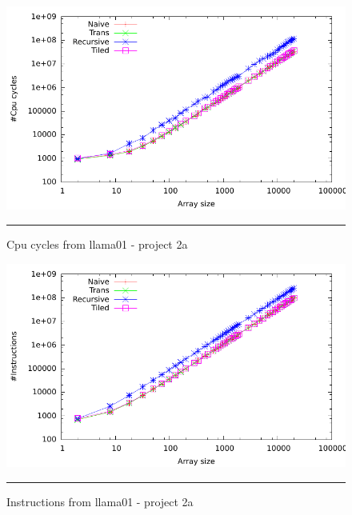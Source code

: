 \begin{figure}[ht]
	\centering
		\includegraphics[width=\textwidth]{./Appendices/Figures/Project2a/Cpu_cycles_putty.pdf}
		\rule{35em}{0.5pt}
	\caption*{
	Cpu cycles from llama01 - project 2a
	}
	\label{fig:Cpu_cycles_p2putty}
\end{figure}
\begin{figure}[ht]
	\centering
		\includegraphics[width=\textwidth]{./Appendices/Figures/Project2a/Instructions_putty.pdf}
		\rule{35em}{0.5pt}
	\caption*{
	Instructions from llama01 - project 2a
	}
	\label{fig:Instructions_p2putty}
\end{figure}

